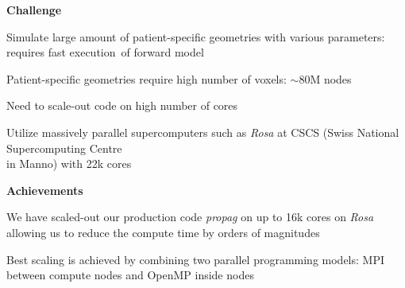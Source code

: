 \documentclass[12pt]{ICSPoster}
\begin{document}
\begin{posterbox}[2]
    \begin{headerbox}[
        title=A Case for High Performance Computing,
        height=0.25\textheight,
        width=0.47\textwidth]
      \textbf{Challenge}
      \begin{compactitem}
        \item Simulate large amount of patient-specific geometries with various
              parameters: requires fast execution\ of forward model
        \item Patient-specific geometries require high number of voxels: $\sim 80$M nodes
        \item Need to scale-out code on high number of cores
        \item Utilize massively parallel supercomputers such as \textit{Rosa} at CSCS
              (Swiss National Supercomputing Centre\\ in Manno) with 22k cores
      \end{compactitem}

      \vspace{0.5cm}

      \textbf{Achievements}
      \begin{compactitem}
        \item We have scaled-out our production code \textit{propag} on up to 16k cores on \textit{Rosa}
              allowing us to reduce the compute time by orders of magnitudes
        \item Best scaling is achieved by combining two parallel programming models:
              MPI between compute nodes and OpenMP inside nodes
      \end{compactitem}

      \vspace{0.5cm}


\end{headerbox}
\end{posterbox}
\end{document}

